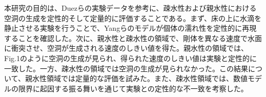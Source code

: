 \documentclass[a4paper]{jsarticle}
\begin{document}
{ 本研究の目的は、Duezらの実験データを参考に、疎水性および親水性における空洞の生成を定性的そして定量的に評価することである。まず、床の上に水滴を静止させる実験を行うことで、Yangらのモデルが個体の濡れ性を定性的に再現することを確認した。次に、親水性と疎水性の領域で、剛体を異なる速度で水面に衝突させ、空洞が生成される速度のしきい値を得た。親水性の領域では、Fig.1のように空洞の生成が見られ、得られた速度のしきい値は実験と定性的に一致した。一方、疎水性の領域では空洞の生成が見られなかった。この結果について、親水性領域では定量的な評価を試みた。また、疎水性領域では、数値モデルの限界に起因する振る舞いを通じて実験との定性的な不一致を考察した。





}
\end{document}
